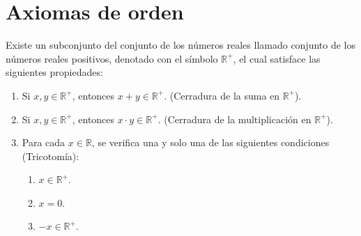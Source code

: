 \documentclass[11pt]{article}
\newcommand{\R}{\mathbb{R}}
\begin{document}
\pagebreak

\part*{Axiomas de orden}

%
Existe un subconjunto del conjunto de los números reales llamado conjunto de los números reales positivos, denotado con el símbolo $\R^+$, el cual satisface las siguientes propiedades:%
\vspace{-1em} \begin{enumerate}[start=12]%
\item Si $x, y \in \R^+$, entonces $x + y \in \R^+$. (Cerradura de la suma en $\R^+$).
\item Si $x, y \in \R^+$, entonces $x \cdot y \in \R^+$. (Cerradura de la multiplicación en $\R^+$).
\item Para cada $x\in \R$, se verifica una y solo una de las siguientes condiciones (Tricotomía):
\begin{enumerate}[label=\roman*)]
\item $x \in \R^+$.
\item $x = 0$.
\item $-x \in \R^+$.
\end{enumerate}
\end{enumerate}\vspace{-1em}
\end{document}
